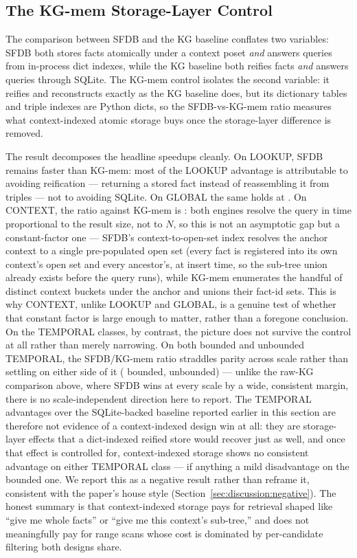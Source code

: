 \subsection{The KG-mem Storage-Layer Control}
\label{sec:eval:control}

The comparison between SFDB and the KG baseline conflates two variables:
SFDB both stores facts atomically under a context poset \emph{and}
answers queries from in-process dict indexes, while the KG baseline both
reifies facts \emph{and} answers queries through SQLite. The KG-mem
control isolates the second variable: it reifies and reconstructs
exactly as the KG baseline does, but its dictionary tables and triple
indexes are Python dicts, so the SFDB-vs-KG-mem ratio measures what
context-indexed atomic storage buys once the storage-layer difference is
removed.

The result decomposes the headline speedups cleanly. On LOOKUP, SFDB
remains \rangelookupkgmem{} faster than KG-mem: most of the LOOKUP
advantage is attributable to avoiding reification --- returning a stored
fact instead of reassembling it from triples --- not to avoiding SQLite.
On GLOBAL the same holds at \rangeglobalkgmem{}. On CONTEXT, the ratio
against KG-mem is \rangecontextkgmem{}: both engines resolve the query in
time proportional to the result size, not to $N$, so this is not an
asymptotic gap but a constant-factor one --- SFDB's context-to-open-set
index resolves the anchor context to a single pre-populated open set
(every fact is registered into its own context's open set and every
ancestor's, at insert time, so the sub-tree union already exists before
the query runs), while KG-mem enumerates the handful of distinct context
buckets under the anchor and unions their fact-id sets. This is why
CONTEXT, unlike LOOKUP and GLOBAL, is a genuine test of whether that
constant factor is large enough to matter, rather than a foregone
conclusion.
On the TEMPORAL
classes, by contrast, the picture does not survive the control at all
rather than merely narrowing. On both bounded and unbounded TEMPORAL,
the SFDB/KG-mem ratio straddles parity across scale rather than settling
on either side of it
(\rangetemporalkgmem{} bounded, \rangetemporalunbkgmem{} unbounded) ---
unlike the raw-KG comparison above, where SFDB wins at every scale by a
wide, consistent margin, there is no scale-independent direction here to
report. The TEMPORAL
advantages over the SQLite-backed baseline reported earlier in this
section are therefore not evidence of a context-indexed design win at
all: they are storage-layer effects that a dict-indexed reified store
would recover just as well, and once that effect is controlled for,
context-indexed storage shows no consistent advantage on either
TEMPORAL class --- if anything a mild disadvantage on the bounded one.
We report this as a negative result rather than reframe it, consistent
with the paper's house style (Section~\ref{sec:discussion:negative}).
The honest summary is that context-indexed
storage pays for retrieval shaped like ``give me whole facts'' or ``give
me this context's sub-tree,'' and does not
meaningfully pay for range scans whose cost is dominated by
per-candidate filtering both designs share.

